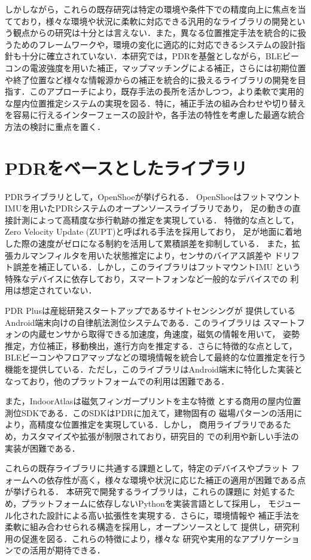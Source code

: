 しかしながら，これらの既存研究は特定の環境や条件下での精度向上に焦点を当てており，様々な環境や状況に柔軟に対応できる汎用的なライブラリの開発という観点からの研究は十分とは言えない．また，異なる位置推定手法を統合的に扱うためのフレームワークや，環境の変化に適応的に対応できるシステムの設計指針も十分に確立されていない．本研究では，PDRを基盤としながら，BLEビーコンの電波強度を用いた補正，マップマッチングによる補正，さらには初期位置や終了位置など様々な情報源からの補正を統合的に扱えるライブラリの開発を目指す．このアプローチにより，既存手法の長所を活かしつつ，より柔軟で実用的な屋内位置推定システムの実現を図る．特に，補正手法の組み合わせや切り替えを容易に行えるインターフェースの設計や，各手法の特性を考慮した最適な統合方法の検討に重点を置く．


















\section{PDRをベースとしたライブラリ}

PDRライブラリとして，OpenShoe\cite{openshoe}が挙げられる．
OpenShoeはフットマウントIMUを用いたPDRシステムのオープンソースライブラリであり，
足の動きの直接計測によって高精度な歩行軌跡の推定を実現している．
特徴的な点として，Zero Velocity Update (ZUPT)と呼ばれる手法を採用しており，
足が地面に着地した際の速度がゼロになる制約を活用して累積誤差を抑制している．
また，拡張カルマンフィルタを用いた状態推定により，センサのバイアス誤差や
ドリフト誤差を補正している．しかし，このライブラリはフットマウントIMU
という特殊なデバイスに依存しており，スマートフォンなど一般的なデバイスでの
利用は想定されていない．

PDR Plus\cite{pdr-plus}は産総研発スタートアップであるサイトセンシングが
提供しているAndroid端末向けの自律航法測位システムである．このライブラリは
スマートフォンの内蔵センサから取得できる加速度，角速度，磁気の情報を用いて，
姿勢推定，方位補正，移動検出，進行方向を推定する．さらに特徴的な点として，
BLEビーコンやフロアマップなどの環境情報を統合して最終的な位置推定を行う
機能を提供している．ただし，このライブラリはAndroid端末に特化した実装と
なっており，他のプラットフォームでの利用は困難である．

また，IndoorAtlas\cite{indoor-atlas}は磁気フィンガープリントを主な特徴
とする商用の屋内位置測位SDKである．このSDKはPDRに加えて，建物固有の
磁場パターンの活用により，高精度な位置推定を実現している．しかし，
商用ライブラリであるため，カスタマイズや拡張が制限されており，研究目的
での利用や新しい手法の実装が困難である．

これらの既存ライブラリに共通する課題として，特定のデバイスやプラット
フォームへの依存性が高く，様々な環境や状況に応じた補正の適用が困難である点が挙げられる．
本研究で開発するライブラリは，これらの課題に
対処するため，プラットフォームに依存しないPythonを実装言語として採用し，
モジュール化された設計による高い拡張性を実現する．さらに，環境情報や
補正手法を柔軟に組み合わせられる構造を採用し，オープンソースとして
提供し，研究利用の促進を図る．これらの特徴により，様々な
研究や実用的なアプリケーションでの活用が期待できる．




